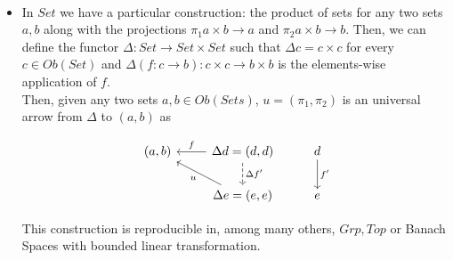 \begin{example}\label{example:prod}\ 
  \begin{itemize}
  \item In $Set$  we have a particular construction: the product of sets for any two sets $a,b$ along with the projections $\pi_1 a \times b \to a$ and $\pi_2 a \times b \to b$. Then, we can define the functor $\Delta: Set \to Set\times Set$ such that $\Delta c = c\times c$ for every $c\in Ob(Set)$ and $\Delta (f:c\to b): c\times c\to b\times b$ is the elements-wise application of $f$.\\

    Then, given any two sets $a,b\in Ob(Sets)$, $u=(\pi_1,\pi_2)$ is an universal arrow from $\Delta$ to $(a,b)$ as

    \[
      \begin{tikzcd}
        (a,b)       & \Delta d=(d,d) \arrow[swap, l, "f"]\arrow[d, "\Delta f'", dashed]& d\arrow[d,"f'"]\\
        &\Delta e=(e,e)\arrow[lu, "u"]& e 
      \end{tikzcd}
    \]

    This construction is reproducible in, among many others, $Grp, Top$ or Banach Spaces with bounded linear transformation. 
  \end{itemize}
\end{example}


